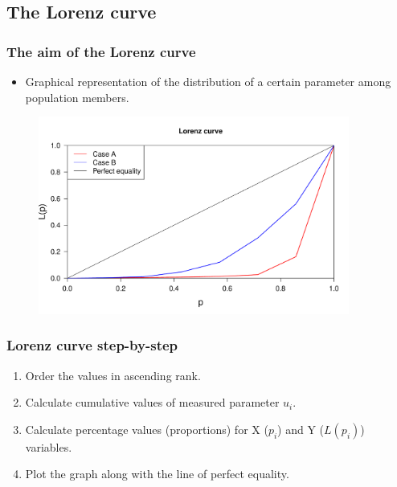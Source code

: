 \subsection{The Lorenz curve}


\begin{frame}
\frametitle{The aim of the Lorenz curve}

\begin{itemize}
  \item Graphical representation of the distribution of a certain parameter among
population members.
\end{itemize}

\begin{figure}
 \includegraphics[height=6.5cm]{figs/example-Lorenz}
\end{figure}

\end{frame}


\begin{frame}
\frametitle{Lorenz curve step-by-step}

\begin{enumerate}
 \item Order the values in ascending rank.
 \item Calculate cumulative values of measured parameter $u_i$.
 \item Calculate percentage values (proportions) for X ($p_i$) and Y ($L(p_i)$) variables.
 \item Plot the graph along with the line of perfect equality.
\end{enumerate}

\end{frame}

